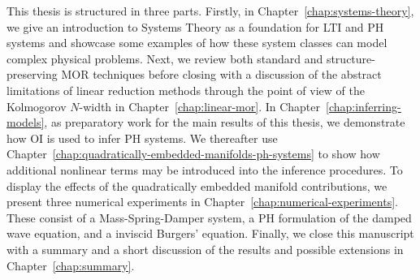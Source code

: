 This thesis is structured in three parts.
Firstly, in Chapter~\ref{chap:systems-theory}, we give an introduction to Systems Theory as a foundation for \ac{LTI} and \ac{PH} systems and showcase some examples of how these system classes can model complex physical problems.
Next, we review both standard and structure-preserving \ac{MOR} techniques before closing with a discussion of the abstract limitations of linear reduction methods through the point of view of the Kolmogorov $N$-width in Chapter~\ref{chap:linear-mor}.
In Chapter~\ref{chap:inferring-models}, as preparatory work for the main results of this thesis, we demonstrate how \ac{OI} is used to infer \ac{PH} systems.
We thereafter use Chapter~\ref{chap:quadratically-embedded-manifolds-ph-systems} to show how additional nonlinear terms may be introduced into the inference procedures.
To display the effects of the quadratically embedded manifold contributions, we present three numerical experiments in Chapter~\ref{chap:numerical-experiments}.
These consist of a Mass-Spring-Damper system, a \ac{PH} formulation of the damped wave equation, and a inviscid Burgers' equation.
Finally, we close this manuscript with a summary and a short discussion of the results and possible extensions in Chapter~\ref{chap:summary}.
